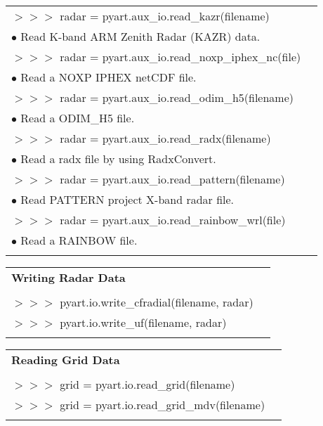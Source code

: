\documentclass[potrait,a0paper,fontscale=0.33]{baposter} %
\begin{document}
\begin{poster}
{\begin{flushleft}
\begin{tabular}{@{}ll@{}}
\\
$>$$>$$>$ radar = pyart.aux\_io.read\_kazr(filename)\\
\-\hspace{0.4cm} $\bullet$ Read K-band ARM Zenith Radar (KAZR) data.\\
$>$$>$$>$ radar = pyart.aux\_io.read\_noxp\_iphex\_nc(file)\\
\-\hspace{0.4cm} $\bullet$ Read a NOXP IPHEX netCDF file.\\
$>$$>$$>$ radar = pyart.aux\_io.read\_odim\_h5(filename)\\
\-\hspace{0.4cm} $\bullet$ Read a ODIM\_H5 file.\\
$>$$>$$>$ radar = pyart.aux\_io.read\_radx(filename)\\
\-\hspace{0.4cm} $\bullet$ Read a radx file by using RadxConvert.\\
$>$$>$$>$ radar = pyart.aux\_io.read\_pattern(filename)\\
\-\hspace{0.4cm} $\bullet$ Read PATTERN project X-band radar file.\\
$>$$>$$>$ radar = pyart.aux\_io.read\_rainbow\_wrl(file)\\
\-\hspace{0.4cm} $\bullet$ 	Read a RAINBOW file.\\

\\
\end{tabular}

\begin{tabular}{@{}ll@{}}
\multicolumn{2}{l}{\cellcolor[HTML]{DDFFFF}\bf Writing Radar Data} \\
\\
$>$$>$$>$ pyart.io.write\_cfradial(filename, radar)\\
$>$$>$$>$ pyart.io.write\_uf(filename, radar)\\
\\
\end{tabular}

\begin{tabular}{@{}ll@{}}
\multicolumn{2}{l}{\cellcolor[HTML]{DDFFFF}\bf Reading Grid Data} \\
\\
$>$$>$$>$ grid = pyart.io.read\_grid(filename)\\
$>$$>$$>$ grid = pyart.io.read\_grid\_mdv(filename)\\
\\
\end{tabular}


\end{flushleft}}
\end{poster}
\end{document}
